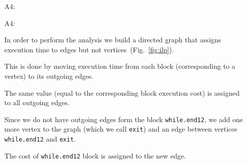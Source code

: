 \documentclass[12pt,a4paper,titlepage,oneside]{article}
\begin{document}
\begin{itemize}
\item[A4:] 
  \item[A4:]

In order to perform the analysis we build a directed graph that assigns execution time to edges but not vertices~(Fig.~\ref{fig:ilp}).

This is done by moving execution time from each block (corresponding to a vertex) to its outgoing edges.

The same value (equal to the corresponding block execution cost) is assigned to all outgoing edges.

Since we do not have outgoing edges form the block \texttt{while.end12}, we add one more vertex to the graph (which we call \texttt{exit}) and an edge between vertices \texttt{while.end12} and \texttt{exit}.

The cost of \texttt{while.end12} block is assigned to the new edge.


\end{itemize}
\end{document}
